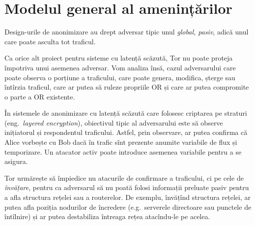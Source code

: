 
\section{Modelul general al amenințărilor}

\indent\indent Design-urile de anonimizare au drept adversar tipic
unul \emph{global, pasiv}, adică unul care poate asculta tot traficul.
 

Ca orice alt proiect pentru sisteme cu latență scăzută, Tor nu
poate proteja împotriva unui asemenea adversar. Vom analiza însă, cazul
adversarului care poate observa o porțiune a traficului, care poate genera,
modifica, șterge sau întîrzia traficul, care ar putea să ruleze propriile OR
și care ar putea compromite o parte a OR existente.

În sistemele de anonimizare cu latență scăzută care folosesc criptarea
pe straturi (eng.\ \emph{layered encryption}), 
obiectivul tipic al adversarului este să observe inițiatorul și respondentul
traficului. Astfel, prin observare, ar putea confirma că Alice vorbește cu Bob
dacă în trafic sînt prezente anumite variabile de flux și temporizare.
Un atacator activ poate introduce asemenea variabile pentru a se asigura.

Tor urmărește să împiedice nu atacurile de confirmare a traficului, ci pe
cele de \emph{învățare}, pentru ca adversarul să nu poată folosi informații
preluate pasiv pentru a afla structura rețelei sau a routerelor. De exemplu,
învățînd structura rețelei, ar putea afla poziția nodurilor de încredere (e.g.\
serverele directoare sau punctele de întîlnire)
și ar putea destabiliza întreaga rețea atacîndu-le pe acelea.
